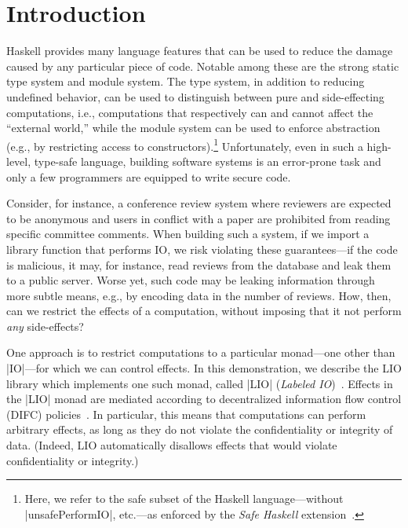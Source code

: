 \section{Introduction}
\label{sec:intro}

Haskell provides many language features that can be used to reduce the
damage caused by any particular piece of code.
%
Notable among these are the strong static type system and module
system.
%
The type system, in addition to reducing undefined behavior, can be
used to distinguish between pure and side-effecting computations,
i.e., computations that respectively can and cannot affect the
``external world,'' while the module system can be used to enforce
abstraction (e.g., by restricting access to constructors).\footnote{
  Here, we refer to the safe subset of the Haskell language---without
  \hs|unsafePerformIO|, etc.---as enforced by
  the \emph{Safe Haskell} extension~\cite{safehaskell}.
}
%
Unfortunately, even in such a high-level, type-safe language, building
software systems is an error-prone task and only a few programmers are
equipped to write secure code.
 
Consider, for instance, a conference review system where reviewers are
expected to be anonymous and users in conflict with a paper are
prohibited from reading specific committee comments.
%
When building such a system, if we import a library function that
performs IO, we risk violating these guarantees---if the code is
malicious, it may, for instance, read reviews from the database and
leak them to a public server.
%
Worse yet, such code may be leaking information through more subtle
means, e.g., by encoding data in the number of reviews.
%
How, then, can we restrict the effects of a computation, without
imposing that it not perform \emph{any} side-effects?
%

One approach is to restrict computations to a particular monad---one
other than \hs|IO|---for which we can control effects.
%
In this demonstration, we describe the LIO library which implements
one such monad, called \hs|LIO| (\emph{Labeled IO})~\cite{lio,
concurrent-lio}.
%
Effects in the \hs|LIO| monad are mediated according to
decentralized information flow control (DIFC)
policies~\cite{myers:dlm, sabelfeld:language-based-iflow}.
%
In particular, this means that computations can perform arbitrary
effects, as long as they do not violate the confidentiality or
integrity of data.
%
(Indeed, LIO automatically disallows effects that would violate
confidentiality or integrity.)
